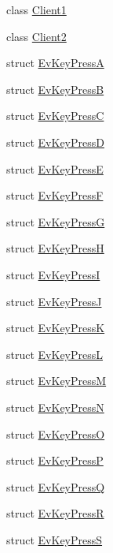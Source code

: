 \begin{DoxyCompactItemize}
\item 
class \hyperlink{classsm__three__some_1_1Client1}{Client1}
\item 
class \hyperlink{classsm__three__some_1_1Client2}{Client2}
\item 
struct \hyperlink{structsm__three__some_1_1EvKeyPressA}{Ev\+Key\+PressA}
\item 
struct \hyperlink{structsm__three__some_1_1EvKeyPressB}{Ev\+Key\+PressB}
\item 
struct \hyperlink{structsm__three__some_1_1EvKeyPressC}{Ev\+Key\+PressC}
\item 
struct \hyperlink{structsm__three__some_1_1EvKeyPressD}{Ev\+Key\+PressD}
\item 
struct \hyperlink{structsm__three__some_1_1EvKeyPressE}{Ev\+Key\+PressE}
\item 
struct \hyperlink{structsm__three__some_1_1EvKeyPressF}{Ev\+Key\+PressF}
\item 
struct \hyperlink{structsm__three__some_1_1EvKeyPressG}{Ev\+Key\+PressG}
\item 
struct \hyperlink{structsm__three__some_1_1EvKeyPressH}{Ev\+Key\+PressH}
\item 
struct \hyperlink{structsm__three__some_1_1EvKeyPressI}{Ev\+Key\+PressI}
\item 
struct \hyperlink{structsm__three__some_1_1EvKeyPressJ}{Ev\+Key\+PressJ}
\item 
struct \hyperlink{structsm__three__some_1_1EvKeyPressK}{Ev\+Key\+PressK}
\item 
struct \hyperlink{structsm__three__some_1_1EvKeyPressL}{Ev\+Key\+PressL}
\item 
struct \hyperlink{structsm__three__some_1_1EvKeyPressM}{Ev\+Key\+PressM}
\item 
struct \hyperlink{structsm__three__some_1_1EvKeyPressN}{Ev\+Key\+PressN}
\item 
struct \hyperlink{structsm__three__some_1_1EvKeyPressO}{Ev\+Key\+PressO}
\item 
struct \hyperlink{structsm__three__some_1_1EvKeyPressP}{Ev\+Key\+PressP}
\item 
struct \hyperlink{structsm__three__some_1_1EvKeyPressQ}{Ev\+Key\+PressQ}
\item 
struct \hyperlink{structsm__three__some_1_1EvKeyPressR}{Ev\+Key\+PressR}
\item 
struct \hyperlink{structsm__three__some_1_1EvKeyPressS}{Ev\+Key\+PressS}
\item 

\end{DoxyCompactItemize}
